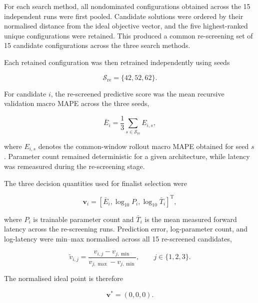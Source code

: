 \documentclass[a4paper,fleqn]{cas-sc}
\begin{document}
For each search method, all nondominated configurations obtained across the 15 independent runs were first pooled. Candidate solutions were ordered by their normalised distance from the ideal objective vector, and the five highest-ranked unique configurations were retained. This produced a common re-screening set of 15 candidate configurations across the three search methods.

Each retained configuration was then retrained independently using seeds

\begin{equation}
\mathcal{S}_{\mathrm{re}}
=
\{42,52,62\}.
\label{eq:rescreen_seeds}
\end{equation}

For candidate $i$, the re-screened predictive score was the mean recursive validation macro MAPE across the three seeds,

\begin{equation}
\bar{E}_{i}
=
\frac{1}{3}
\sum_{s\in\mathcal{S}_{\mathrm{re}}}
E_{i,s},
\label{eq:rescreen_mape}
\end{equation}

where $E_{i,s}$ denotes the common-window rollout macro MAPE obtained for seed $s$. Parameter count remained deterministic for a given architecture, while latency was remeasured during the re-screening stage.

The three decision quantities used for finalist selection were

\begin{equation}
\mathbf{v}_{i}
=
\left[
\bar{E}_{i},
\log_{10}P_i,
\log_{10}\bar{T}_{i}
\right]^{\mathrm{T}},
\label{eq:rescreen_vector}
\end{equation}

where $P_i$ is trainable parameter count and $\bar{T}_{i}$ is the mean measured forward latency across the re-screening runs. Prediction error, log-parameter count, and log-latency were min--max normalised across all 15 re-screened candidates,

\begin{equation}
\tilde{v}_{i,j}
=
\frac{
v_{i,j}-v_{j,\min}
}{
v_{j,\max}-v_{j,\min}
},
\qquad
j\in\{1,2,3\}.
\label{eq:rescreen_normalisation}
\end{equation}

The normalised ideal point is therefore

\begin{equation}
\mathbf{v}^{*}=(0,0,0).
\end{equation}
\end{document}
